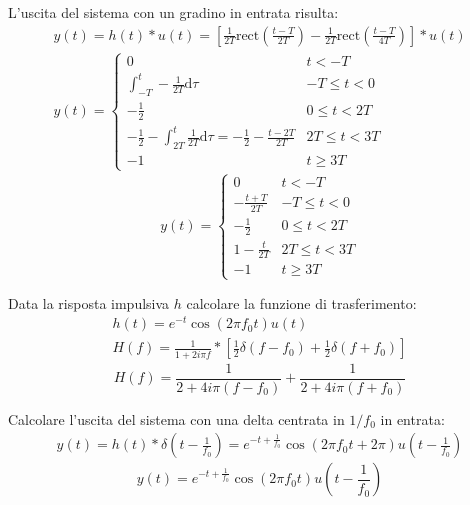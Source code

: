 \documentclass{article}
\newcommand{\rect}{\mbox{rect}}
\newcommand{\df}{\mathrm{d}}
\begin{document}

L'uscita del sistema con un gradino in entrata risulta:
\begin{gather*}
    y(t)=h(t)*u(t)=\left[\displaystyle\frac{1}{2T}\rect\left(\frac{t-T}{2T}\right)-\frac{1}{2T}\rect\left(\frac{t-T}{4T}\right)\right]*u(t)\\
    y(t)=\begin{cases}
        0&t<-T\\
        \displaystyle\int_{-T}^t-\frac{1}{2T}\df\tau&-T\leq t<0\\
        -\displaystyle\frac{1}{2}&0\leq t<2T\\
        \displaystyle-\frac{1}{2}-\int_{2T}^t\frac{1}{2T}\df\tau =\displaystyle-\frac{1}{2}-\frac{t-2T}{2T}&2T\leq t<3T\\
        -1&t\geq 3T
    \end{cases}
\end{gather*}
\begin{equation}
    y(t)=\begin{cases}
        0&t<-T\\
        \displaystyle-\frac{t+T}{2T}&-T\leq t<0\\
        \displaystyle-\frac{1}{2}&0\leq t<2T\\
        1-\displaystyle\frac{t}{2T}&2T\leq t<3T\\
        -1 &t\geq 3T
    \end{cases}
\end{equation}




Data la risposta impulsiva $h$ calcolare la funzione di trasferimento:
\begin{gather*}
    h(t)=e^{-t}\cos(2\pi f_0t)u(t)\\
    H(f)=\displaystyle\frac{1}{1+2i\pi f}*\left[\frac{1}{2}\delta(f-f_0)+\frac{1}{2}\delta(f+f_0)\right]
\end{gather*}
\begin{equation}
    H(f)=\displaystyle\frac{1}{2+4i\pi (f-f_0)}+\frac{1}{2+4i\pi (f+f_0)}
\end{equation}


Calcolare l'uscita del sistema con una delta centrata in $1/f_0$ in entrata:
\begin{gather*}
    y(t)=h(t)*\delta\left(t-\displaystyle\frac{1}{f_0}\right)=e^{-t+\frac{1}{f_0}}\cos\left(2\pi f_0t+2\pi\right)u\left(t-\frac{1}{f_0}\right)
\end{gather*}
\begin{equation}
    y(t)=e^{-t+\frac{1}{f_0}}\cos\left(2\pi f_0t\right)u\left(t-\frac{1}{f_0}\right)
\end{equation}
\end{document}
